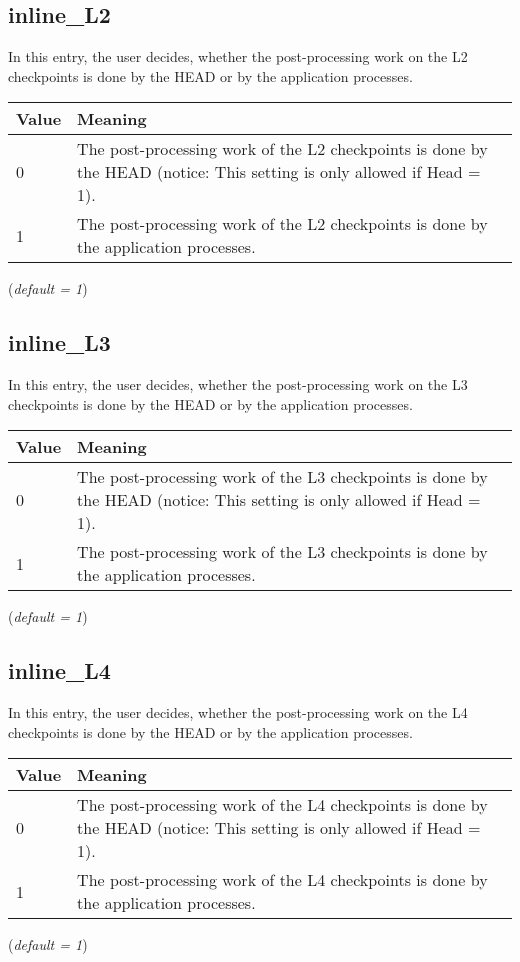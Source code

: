 \documentclass{refrep}
\begin{document}
\subsection{inline\_L2}\label{subsec:inlinel2}
In this entry, the user decides, whether the post-processing work on the L2 checkpoints is done by the HEAD or by the application processes.
\begin{center}
\begin{tabular}[h!]{|p{}|p{}|}
\hline
\textbf{Value} & \textbf{Meaning} \\ \hline
0 & The post-processing work of the L2 checkpoints is done by the HEAD (notice: This setting is only allowed if Head = 1).  \\ \hline
1 & The post-processing work of the L2 checkpoints is done by the application processes.  \\ \hline
\end{tabular}
\end{center}
(\textit{default = 1})
\subsection{inline\_L3}\label{subsec:inlinel3}
In this entry, the user decides, whether the post-processing work on the L3 checkpoints is done by the HEAD or by the application processes.
\begin{center}
\begin{tabular}[h!]{|p{}|p{}|}
\hline
\textbf{Value} & \textbf{Meaning} \\ \hline
0 & The post-processing work of the L3 checkpoints is done by the HEAD (notice: This setting is only allowed if Head = 1).  \\ \hline
1 & The post-processing work of the L3 checkpoints is done by the application processes.  \\ \hline
\end{tabular}
\end{center}
(\textit{default = 1})
\subsection{inline\_L4}\label{subsec:inlinel4}
In this entry, the user decides, whether the post-processing work on the L4 checkpoints is done by the HEAD or by the application processes.
\begin{center}
\begin{tabular}[h!]{|p{}|p{}|}
\hline
\textbf{Value} & \textbf{Meaning} \\ \hline
0 & The post-processing work of the L4 checkpoints is done by the HEAD (notice: This setting is only allowed if Head = 1).  \\ \hline
1 & The post-processing work of the L4 checkpoints is done by the application processes.  \\ \hline
\end{tabular}
\end{center}
(\textit{default = 1})
\end{document}
